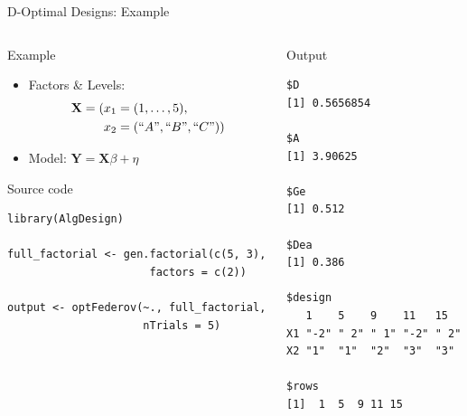 \documentclass[10pt, compress, aspectratio=169, xcolor={table,usenames,dvipsnames}]{beamer}
\begin{document}
\begin{frame}[fragile,label={sec:orgdbd2e06}]{D-Optimal Designs: Example}
 \begin{columns}
\begin{column}{0.6\columnwidth}
\begin{block}{Example}
\begin{itemize}
\item Factors \& Levels:
\begin{align*}
\mathbf{X} = (x_1 = & \; (1, \dots, 5), \\
x_2 = & \; (``A", ``B", ``C"))
\end{align*}
\item Model: \(\mathbf{Y} = \mathbf{X}\beta + \eta\)
\end{itemize}

\begin{block}{Source code}
\vspace{-.2cm}

\lstset{language=r,label= ,caption= ,captionpos=b,numbers=none}
\begin{lstlisting}
library(AlgDesign)

full_factorial <- gen.factorial(c(5, 3),
                      factors = c(2))

output <- optFederov(~., full_factorial,
                     nTrials = 5)
\end{lstlisting}
\end{block}
\end{block}
\end{column}

\begin{column}{0.4\columnwidth}
\begin{block}{Output}
\vspace{-.2cm}
\scriptsize

\begin{verbatim}
$D
[1] 0.5656854

$A
[1] 3.90625

$Ge
[1] 0.512

$Dea
[1] 0.386

$design
   1    5    9    11   15
X1 "-2" " 2" " 1" "-2" " 2"
X2 "1"  "1"  "2"  "3"  "3"

$rows
[1]  1  5  9 11 15
\end{verbatim}


\normalsize
\end{block}
\end{column}
\end{columns}
\end{frame}
\end{document}
